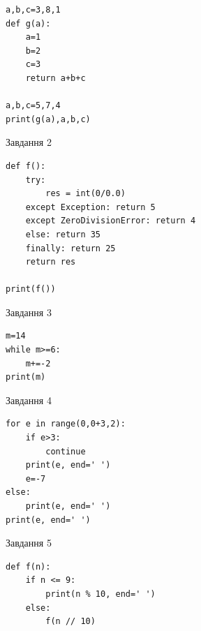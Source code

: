 \documentclass[12pt, ukrainian]{article}
\begin{document}
{{{{{{{{{{{{\begin{minipage}[t]{8.5cm}
\begin{verbatim}
a,b,c=3,8,1
def g(a):
    a=1
    b=2
    c=3
    return a+b+c

a,b,c=5,7,4
print(g(a),a,b,c)
\end{verbatim}


\vspace{5mm}
               
{\begin{center}Завдання {2}\end{center}}
\vspace{-6mm}

\begin{verbatim}
def f():
    try:
        res = int(0/0.0)
    except Exception: return 5
    except ZeroDivisionError: return 4
    else: return 35
    finally: return 25
    return res

print(f())
\end{verbatim}


\vspace{5mm}
               
{\begin{center}Завдання {3}\end{center}}
\vspace{-6mm}

\begin{verbatim}
m=14
while m>=6:
    m+=-2
print(m)
\end{verbatim}


\end{minipage}
\vline \hspace{6mm}
\begin{minipage}[t]{10.7cm}
               
{\begin{center}Завдання {4}\end{center}}
\vspace{-6mm}

\begin{verbatim}
for e in range(0,0+3,2):
    if e>3:
        continue
    print(e, end=' ')
    e=-7
else:
    print(e, end=' ')
print(e, end=' ')
\end{verbatim}


\vspace{5mm}
               
{\begin{center}Завдання {5}\end{center}}
\vspace{-6mm}

\begin{verbatim}
def f(n):
    if n <= 9:
        print(n % 10, end=' ')
    else:
        f(n // 10)


\end{verbatim}
\end{minipage}}}}}}}}}}}}}
\end{document}
